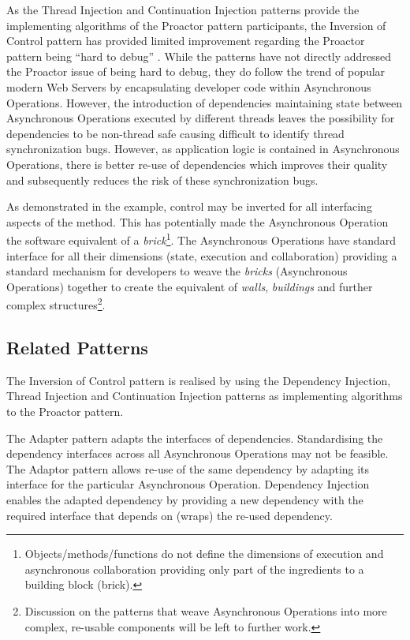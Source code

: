 \documentclass[prodmode]{style/acmlarge}
\begin{document}
As the Thread Injection and Continuation Injection patterns provide the
implementing algorithms of the Proactor pattern participants, the Inversion of
Control pattern has provided limited improvement regarding the Proactor pattern
being ``hard to debug'' \cite[p. 7]{proactor}.  While the patterns have not
directly addressed the Proactor issue of being hard to debug, they do follow the
trend of popular modern Web Servers by encapsulating developer code within
Asynchronous Operations.  However, the introduction of dependencies maintaining
state between Asynchronous Operations executed by different threads leaves the
possibility for dependencies to be non-thread safe causing difficult to identify
thread synchronization bugs.  However, as application logic is contained in
Asynchronous Operations, there is better re-use of dependencies which improves
their quality and subsequently reduces the risk of these synchronization bugs.

As demonstrated in the example, control may be inverted for all interfacing
aspects of the method.  This has potentially made the Asynchronous Operation the
software equivalent of a \textit{brick}\footnote{Objects/methods/functions do
not define the dimensions of execution and asynchronous collaboration providing
only part of the ingredients to a building block (brick).}.  The Asynchronous
Operations have standard interface for all their dimensions (state, execution
and collaboration) providing a standard mechanism for developers to weave the
\textit{bricks} (Asynchronous Operations) together to create the equivalent of
\textit{walls}, \textit{buildings} and further complex
structures\footnote{Discussion on the patterns that weave Asynchronous
Operations into more complex, re-usable components will be left to further
work.}.


\subsection{Related Patterns}

The Inversion of Control pattern is realised by using the Dependency Injection,
Thread Injection and Continuation Injection patterns as implementing algorithms
to the Proactor pattern.

The Adapter pattern \cite{gof} adapts the interfaces of dependencies.
Standardising the dependency interfaces across all Asynchronous Operations may
not be feasible.  The Adaptor pattern allows re-use of the same dependency by
adapting its interface for the particular Asynchronous Operation.  Dependency
Injection enables the adapted dependency by providing a new dependency with the
required interface that depends on (wraps) the re-used dependency.
\end{document}
